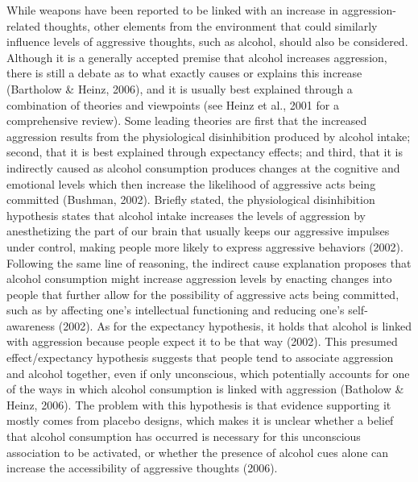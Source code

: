 \documentclass[authordate, serif, review]{jote-article}
\begin{document}
\begin{multicols}{2}
While weapons have been reported to be linked with an increase in aggression-related thoughts, other elements from the environment that could similarly influence levels of aggressive thoughts, such as alcohol, should also be considered. Although it is a generally accepted premise that alcohol increases aggression, there is still a debate as to what exactly causes or explains this increase (Bartholow \& Heinz, 2006), and it is usually best explained through a combination of theories and viewpoints (see Heinz et al., 2001 for a comprehensive review). Some leading theories are first that the increased aggression results from the physiological disinhibition produced by alcohol intake; second, that it is best explained through expectancy effects; and third, that it is indirectly caused as alcohol consumption produces changes at the cognitive and emotional levels which then increase the likelihood of aggressive acts being committed (Bushman, 2002). Briefly stated, the physiological disinhibition hypothesis states that alcohol intake increases the levels of aggression by anesthetizing the part of our brain that usually keeps our aggressive impulses under control, making people more likely to express aggressive behaviors (2002). Following the same line of reasoning, the indirect cause explanation proposes that alcohol consumption might increase aggression levels by enacting changes into people that further allow for the possibility of aggressive acts being committed, such as by affecting one's intellectual functioning and reducing one's self-awareness (2002). As for the expectancy hypothesis, it holds that alcohol is linked with aggression because people expect it to be that way (2002). This presumed effect/expectancy hypothesis suggests that people tend to associate aggression and alcohol together, even if only unconscious, which potentially accounts for one of the ways in which alcohol consumption is linked with aggression (Batholow \& Heinz, 2006). The problem with this hypothesis is that evidence supporting it mostly comes from placebo designs, which makes it is unclear whether a belief that alcohol consumption has occurred is necessary for this unconscious association to be activated, or whether the presence of alcohol cues alone can increase the accessibility of aggressive thoughts (2006).  


\end{multicols}
\end{document}
